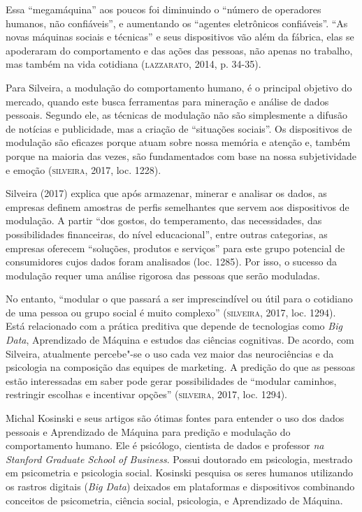 Essa ``megamáquina'' aos poucos foi diminuindo o ``número de operadores
humanos, não confiáveis'', e aumentando os ``agentes eletrônicos
confiáveis''. ``As novas máquinas sociais e técnicas'' e seus
dispositivos vão além da fábrica, elas se apoderaram do comportamento e
das ações das pessoas, não apenas no trabalho, mas também na vida
cotidiana (\textsc{lazzarato}, 2014, p. 34-35).

Para Silveira, a modulação do comportamento humano, é o principal
objetivo do mercado, quando este busca ferramentas para mineração e
análise de dados pessoais. Segundo ele, as técnicas de modulação não são
simplesmente a difusão de notícias e publicidade, mas a criação de
``situações sociais''. Os dispositivos de modulação são eficazes porque
atuam sobre nossa memória e atenção e, também porque na maioria das
vezes, são fundamentados com base na nossa subjetividade e emoção
(\textsc{silveira}, 2017, loc. 1228).

Silveira (2017) explica que após armazenar, minerar e analisar os dados,
as empresas definem amostras de perfis semelhantes que servem aos
dispositivos de modulação. A partir ``dos gostos, do temperamento, das
necessidades, das possibilidades financeiras, do nível educacional'',
entre outras categorias, as empresas oferecem ``soluções, produtos e
serviços'' para este grupo potencial de consumidores cujos dados foram
analisados (loc. 1285). Por isso, o sucesso da modulação requer uma
análise rigorosa das pessoas que serão moduladas.

No entanto, ``modular o que passará a ser imprescindível ou útil para o
cotidiano de uma pessoa ou grupo social é muito complexo'' (\textsc{silveira},
2017, loc. 1294). Está relacionado com a prática preditiva que depende
de tecnologias como \emph{Big Data}, Aprendizado de Máquina e estudos
das ciências cognitivas. De acordo, com Silveira, atualmente percebe"-se
o uso cada vez maior das neurociências e da psicologia na composição das
equipes de marketing. A predição do que as pessoas estão interessadas em
saber pode gerar possibilidades de ``modular caminhos, restringir
escolhas e incentivar opções'' (\textsc{silveira}, 2017, loc. 1294).

Michal Kosinski e seus artigos são ótimas fontes para entender o uso dos
dados pessoais e Aprendizado de Máquina para predição e modulação do
comportamento humano. Ele é psicólogo, cientista de dados e professor
\emph{na Stanford Graduate School of Business}. Possui doutorado em
psicologia, mestrado em psicometria e psicologia social. Kosinski
pesquisa os seres humanos utilizando os rastros digitais (\emph{Big
Data}) deixados em plataformas e dispositivos combinando conceitos de
psicometria, ciência social, psicologia, e Aprendizado de Máquina.

